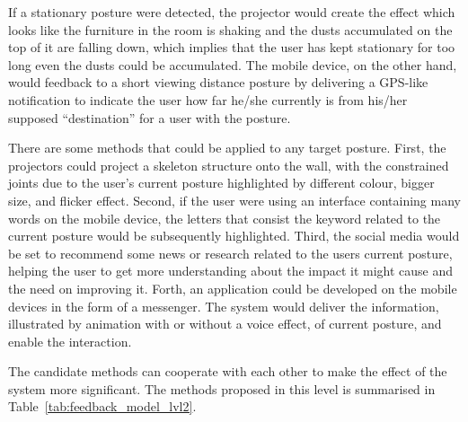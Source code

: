 If a stationary posture were detected, the projector would create the effect which looks like the furniture in the room is shaking and the dusts accumulated on the top of it are falling down, which implies that the user has kept stationary for too long even the dusts could be accumulated. The mobile device, on the other hand, would feedback to a short viewing distance posture by delivering a GPS-like notification to indicate the user how far he/she currently is from his/her supposed “destination” for a user with the posture.

There are some methods that could be applied to any target posture. First, the projectors could project a skeleton structure onto the wall, with the constrained joints due to the user’s current posture highlighted by different colour, bigger size, and flicker effect. Second, if the user were using an interface containing many words on the mobile device, the letters that consist the keyword related to the current posture would be subsequently highlighted. Third, the social media would be set to recommend some news or research related to the users current posture, helping the user to get more understanding about the impact it might cause and the need on improving it. Forth, an application could be developed on the mobile devices in the form of a messenger. The system would deliver the information, illustrated by animation with or without a voice effect, of current posture, and enable the interaction. 

The candidate methods can cooperate with each other to make the effect of the system more significant. The methods proposed in this level is summarised in Table~\ref{tab:feedback_model_lvl2}. 

